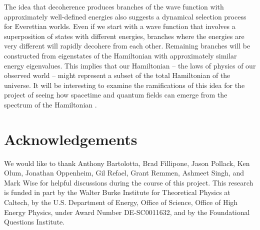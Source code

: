 \documentclass[aps,prd,onecolumn,nofootinbib,notitlepage]{revtex4-1}
\begin{document}
The idea that decoherence produces branches of the wave function with approximately well-defined energies also suggests a dynamical selection process for Everettian worlds.
Even if we start with a wave function that involves a superposition of states with different energies, branches where the energies are very different will rapidly decohere from each other.
Remaining branches will be constructed from eigenstates of the Hamiltonian with approximately similar energy eigenvalues.
This implies that our Hamiltonian -- the laws of physics of our observed world -- might represent a subset of the total Hamiltonian of the universe.
It will be interesting to examine the ramifications of this idea for the project of seeing how spacetime and quantum fields can emerge from the spectrum of the Hamiltonian \cite{Cao:2016mst,Cao:2017hrv,Cotler:2017abq,Carroll:2018rhc,Carroll:2021aiq}.



\section*{Acknowledgements}
We would like to thank Anthony Bartolotta, Brad Fillipone, Jason Pollack, Ken Olum, Jonathan Oppenheim, Gil Refael, Grant Remmen, Ashmeet Singh, and Mark Wise for helpful discussions during the course of this project. This research is funded in part by the Walter Burke Institute for Theoretical Physics at Caltech, by the U.S. Department of Energy, Office of Science, Office of High Energy Physics, under Award Number DE-SC0011632, and by the Foundational Questions Institute.




\end{document}
